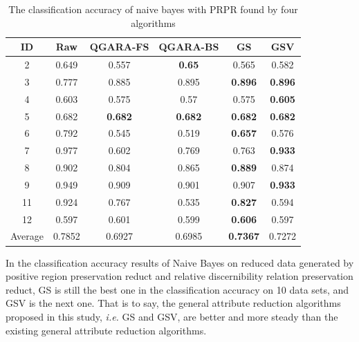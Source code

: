 \documentclass[review]{elsarticle}
\begin{document}
		\begin{table}[htbp]
			\centering
			\caption{The classification accuracy of naive bayes with PRPR found by four algorithms}
			\begin{tabular}{cccccc}
				\hline
				ID    & Raw   & QGARA-FS & QGARA-BS & GS    & GSV \\\hline
				2     & 0.649 & 0.557 & \textbf{0.65} & 0.565 & 0.582 \\
				3     & 0.777 & 0.885 & 0.895 & \textbf{0.896} & \textbf{0.896} \\
				4     & 0.603 & 0.575 & 0.57  & 0.575 & \textbf{0.605} \\
				5     & 0.682 & \textbf{0.682} & \textbf{0.682} & \textbf{0.682} & \textbf{0.682} \\
				6     & 0.792 & 0.545 & 0.519 & \textbf{0.657} & 0.576 \\
				7     & 0.977 & 0.602 & 0.769 & 0.763 & \textbf{0.933} \\
				8     & 0.902 & 0.804 & 0.865 & \textbf{0.889} & 0.874 \\
				9     & 0.949 & 0.909 & 0.901 & 0.907 & \textbf{0.933} \\
				11    & 0.924 & 0.767 & 0.535 & \textbf{0.827} & 0.594 \\
				12    & 0.597 & 0.601 & 0.599 & \textbf{0.606} & 0.597 \\\hline
				Average & 0.7852 & 0.6927 & 0.6985 & \textbf{0.7367} & 0.7272 \\\hline
			\end{tabular}%
			\label{canbp}%
		\end{table}%
		\par In the classification accuracy results of Naive Bayes on reduced data generated by positive region preservation reduct and relative discernibility relation preservation reduct, GS is still the best one in the classification accuracy on 10 data sets, and GSV is the next one. That is to say, the general attribute reduction algorithms proposed in this study, \emph{i.e.} GS and GSV, are better and more steady than the existing general attribute reduction algorithms. 
		
\end{document}
